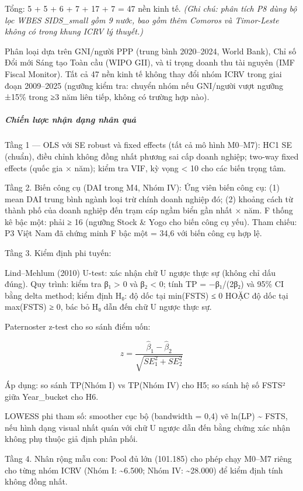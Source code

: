 \documentclass[12pt,a4paper]{article}
\begin{document}
Tổng: 5 + 5 + 6 + 7 + 17 + 7 = 47 nền kinh tế. \emph{(Ghi chú: phân tích
P8 dùng bộ lọc WBES SIDS\_small gồm 9 nước, bao gồm thêm Comoros và
Timor-Leste không có trong khung ICRV lý thuyết.)}

Phân loại dựa trên GNI/người PPP (trung bình 2020--2024, World Bank),
Chỉ số Đổi mới Sáng tạo Toàn cầu (WIPO GII), và tỉ trọng doanh thu tài
nguyên (IMF Fiscal Monitor). Tất cả 47 nền kinh tế không thay đổi nhóm
ICRV trong giai đoạn 2009--2025 (ngưỡng kiểm tra: chuyển nhóm nếu
GNI/người vượt ngưỡng ±15\% trong ≥3 năm liên tiếp, không có trường hợp
nào).

\hypertarget{chiux1ebfn-lux1b0ux1ee3c-nhux1eadn-dux1ea1ng-nhuxe2n-quux1ea3}{%
\subparagraph{Chiến lược nhận dạng nhân
quả}\label{chiux1ebfn-lux1b0ux1ee3c-nhux1eadn-dux1ea1ng-nhuxe2n-quux1ea3}}

Tầng 1 --- OLS với SE robust và fixed effects (tất cả mô hình M0--M7):
HC1 SE (chuẩn), điều chỉnh không đồng nhất phương sai cấp doanh nghiệp;
two-way fixed effects (quốc gia × năm); kiểm tra VIF, kỳ vọng
\textless{} 10 cho các biến trọng tâm.

Tầng 2. Biến công cụ (DAI trong M4, Nhóm IV): Ứng viên biến công cụ: (1)
mean DAI trung bình ngành loại trừ chính doanh nghiệp đó; (2) khoảng
cách từ thành phố của doanh nghiệp đến trạm cáp ngầm biển gần nhất ×
năm. F thống kê bậc một: phải ≥ 16 (ngưỡng Stock \& Yogo cho biến công
cụ yếu). Tham chiếu: P3 Việt Nam đã chứng minh F bậc một = 34,6 với biến
công cụ hợp lệ.

Tầng 3. Kiểm định phi tuyến:

Lind--Mehlum (2010) U-test: xác nhận chữ U ngược thực sự (không chỉ dấu
đúng). Quy trình: kiểm tra β₁ \textgreater{} 0 và β₂ \textless{} 0; tính
TP = −β₁/(2β₂) và 95\% CI bằng delta method; kiểm định H₀: độ dốc tại
min(FSTS) ≤ 0 HOẶC độ dốc tại max(FSTS) ≥ 0, bác bỏ H₀ dẫn đến chữ U
ngược thực sự.

Paternoster z-test cho so sánh điểm uốn:

\[z = \frac{\hat{\beta}_1 - \hat{\beta}_2}{\sqrt{SE_1^2 + SE_2^2}}\]

Áp dụng: so sánh TP(Nhóm I) vs TP(Nhóm IV) cho H5; so sánh hệ số FSTS²
giữa Year\_bucket cho H6.

LOWESS phi tham số: smoother cục bộ (bandwidth = 0,4) vẽ ln(LP)
\textasciitilde{} FSTS, nếu hình dạng visual nhất quán với chữ U ngược
dẫn đến bằng chứng xác nhận không phụ thuộc giả định phân phối.

Tầng 4. Nhân rộng mẫu con: Pool đủ lớn (101.185) cho phép chạy M0--M7
riêng cho từng nhóm ICRV (Nhóm I: \textasciitilde6.500; Nhóm IV:
\textasciitilde28.000) để kiểm định tính không đồng nhất.
\end{document}
